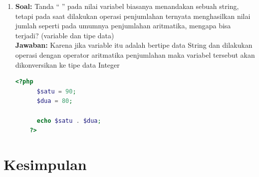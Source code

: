 \documentclass[a4paper]{article}
\begin{document}
\begin{enumerate}
  \item 
  {\bfseries Soal:} Tanda “ ” pada nilai variabel biasanya menandakan sebuah string, tetapi pada saat
  dilakukan operasi penjumlahan ternyata menghasilkan nilai jumlah seperti pada
  umumnya penjumlahan aritmatika, mengapa bisa terjadi? (variable dan tipe data)
  \\
  {\bfseries Jawaban:} Karena jika variable itu adalah bertipe data String dan dilakukan operasi dengan operator aritmatika penjumlahan maka variabel tersebut akan dikonversikan ke tipe data Integer

  \begin{lstlisting}[language=PHP]
    <?php 
      $satu = 90;
      $dua = 80;

      echo $satu . $dua;
    ?>
  \end{lstlisting}

\end{enumerate}
  \newpage
  \section{Kesimpulan}

  \newpage

  \nocite{bkpm}
  \nocite{wstack}

  \begin{center}
  \printbibliography[heading=bibintoc,title={Daftar Pustaka}]
  \end{center}
\end{document}
